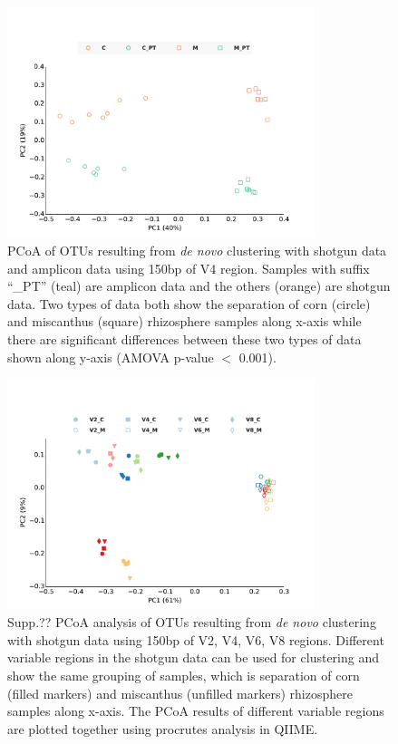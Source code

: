 \documentclass[12pt]{article}
\begin{document}
\begin{figure}[tbph!]
  \centering
  \includegraphics[width=0.8\textwidth]{figs/V4_SGvsPT_pcoa}
  \caption[PCoA of OTUs resulting from {\em de novo} clustering with shotgun data and amplicon data using 150bp of V4 region]{PCoA of OTUs resulting from {\em de novo} clustering with shotgun data and amplicon data using 150bp of V4 region. Samples with suffix ``\_PT'' (teal) are amplicon data and the others (orange) are shotgun data. Two types of data both show the separation of corn (circle) and miscanthus (square) rhizosphere samples along x-axis while there are significant differences between these two types of data shown along y-axis (AMOVA p-value $<$ 0.001).}
  \label{fig:V4_SGvsPT_pcoa}
\end{figure}

\begin{figure}[tbph!]
  \centering
  \includegraphics[width=0.8\textwidth]{figs/compare_vregion_color_1leg}
  \caption[PCoA analysis of OTUs resulting from {\em de novo} clustering with shotgun data using 150bp of V2, V4, V6, V8 regions]{Supp.?? PCoA analysis of OTUs resulting from {\em de novo} clustering with shotgun data using 150bp of V2, V4, V6, V8 regions. Different variable regions in the shotgun data can be used for clustering and show the same grouping of samples, which is separation of corn (filled markers) and miscanthus (unfilled markers) rhizosphere samples along x-axis. The PCoA results of different variable regions are plotted together using procrutes analysis in QIIME.}
  \label{fig:compare_vregion}
\end{figure}
\end{document}
